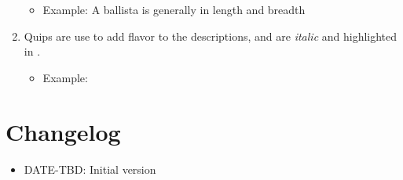 \begin{enumerate}[leftmargin=12pt]
	\begin{itemize}\item Example: A ballista is generally  in length and breadth\end{itemize}
\item Quips are use to add flavor to the descriptions, and are \textit{italic} and highlighted in .
	\begin{itemize}\item Example: \end{itemize}
\end{enumerate}
\section{Changelog}
\begin{itemize}[leftmargin=12pt]
\item DATE-TBD: Initial version
\end{itemize}